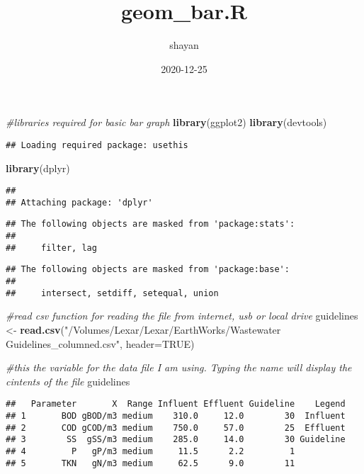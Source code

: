\documentclass[
]{article}
\title{geom\_bar.R}
\author{shayan}
\date{2020-12-25}
\newenvironment{Shaded}{\begin{snugshade}}{\end{snugshade}}
\newcommand{\CommentTok}[1]{\textcolor[rgb]{0.56,0.35,0.01}{\textit{#1}}}
\newcommand{\DataTypeTok}[1]{\textcolor[rgb]{0.13,0.29,0.53}{#1}}
\newcommand{\KeywordTok}[1]{\textcolor[rgb]{0.13,0.29,0.53}{\textbf{#1}}}
\newcommand{\NormalTok}[1]{#1}
\newcommand{\OtherTok}[1]{\textcolor[rgb]{0.56,0.35,0.01}{#1}}
\newcommand{\StringTok}[1]{\textcolor[rgb]{0.31,0.60,0.02}{#1}}
\begin{document}
\maketitle

\begin{Shaded}
\begin{Highlighting}[]
\CommentTok{#libraries required for basic bar graph}
\KeywordTok{library}\NormalTok{(ggplot2)}
\KeywordTok{library}\NormalTok{(devtools)}
\end{Highlighting}
\end{Shaded}

\begin{verbatim}
## Loading required package: usethis
\end{verbatim}

\begin{Shaded}
\begin{Highlighting}[]
\KeywordTok{library}\NormalTok{(dplyr)}
\end{Highlighting}
\end{Shaded}

\begin{verbatim}
## 
## Attaching package: 'dplyr'
\end{verbatim}

\begin{verbatim}
## The following objects are masked from 'package:stats':
## 
##     filter, lag
\end{verbatim}

\begin{verbatim}
## The following objects are masked from 'package:base':
## 
##     intersect, setdiff, setequal, union
\end{verbatim}

\begin{Shaded}
\begin{Highlighting}[]
\CommentTok{#read csv function for reading the file from internet, usb or local drive}
\NormalTok{guidelines <-}\StringTok{ }\KeywordTok{read.csv}\NormalTok{(}\StringTok{"/Volumes/Lexar/Lexar/EarthWorks/Wastewater Guidelines_columned.csv"}\NormalTok{, }\DataTypeTok{header=}\OtherTok{TRUE}\NormalTok{)}

\CommentTok{#this the variable for the data file I am using. Typing the name will display the cintents of the file}
\NormalTok{guidelines}
\end{Highlighting}
\end{Shaded}

\begin{verbatim}
##   Parameter       X  Range Influent Effluent Guideline    Legend
## 1       BOD gBOD/m3 medium    310.0     12.0        30  Influent
## 2       COD gCOD/m3 medium    750.0     57.0        25  Effluent
## 3        SS  gSS/m3 medium    285.0     14.0        30 Guideline
## 4         P   gP/m3 medium     11.5      2.2         1          
## 5       TKN   gN/m3 medium     62.5      9.0        11
\end{verbatim}
\end{document}
